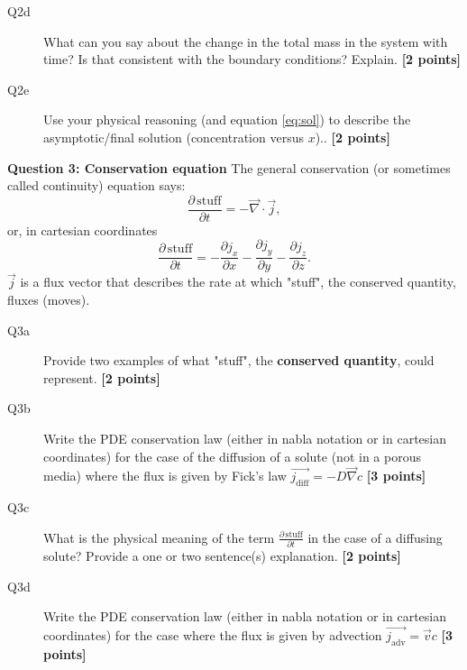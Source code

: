 \documentclass{article}
\begin{document}
\begin{description}
\item [Q2d] What can you say about the change in the total mass in the system with time? Is that consistent with the boundary conditions? Explain. \textbf{[2 points]}
\vspace{2cm}

\item [Q2e] Use your physical reasoning (and equation \ref{eq:sol}) to describe the asymptotic/final solution (concentration versus $x$).. \textbf{[2 points]}
\vspace{2cm}

\end{description}

\textbf{Question 3: Conservation equation}
The general conservation (or sometimes called continuity) equation says:
\begin{equation}
\frac{\partial \, \mathrm{stuff}}{\partial t} = - \overrightarrow{\nabla } \cdot\overrightarrow{j},
\end{equation} or, in cartesian coordinates
\begin{equation}
\frac{\partial \, \mathrm{stuff}}{\partial t} = - \frac{\partial j_x}{\partial x} - \frac{\partial j_y}{\partial y} - \frac{\partial j_z}{\partial z}.
\end{equation} $ \overrightarrow{j} $ is a flux vector that describes the rate at which "stuff", the conserved quantity, fluxes (moves).


\begin{description}
\item [Q3a] Provide two examples of what "stuff", the \textbf{conserved quantity}, could represent. \textbf{[2 points]}
\vspace{2.5cm}

\item [Q3b] Write the PDE conservation law (either in nabla notation or in cartesian coordinates) for the case of the diffusion of a solute (not in a porous media) where the flux is given by Fick's law $ \overrightarrow{j_{\mathrm{diff}}} = - D \overrightarrow{\nabla} c$ \textbf{[3 points]}
\vspace{2.5cm}


\item [Q3c] What is the physical meaning of the term $\frac{\partial \, \mathrm{stuff}}{\partial t}$ in the case of a diffusing solute? Provide a one or two sentence(s) explanation. \textbf{[2 points]}
\vspace{2.5cm}

\item [Q3d] Write the PDE conservation law (either in nabla notation or in cartesian coordinates) for the case where the flux is given by advection $ \overrightarrow{j_{\mathrm{adv}}} = \overrightarrow{v} c$ \textbf{[3 points]}
\vspace{2.5cm}

\end{description}
\end{document}
